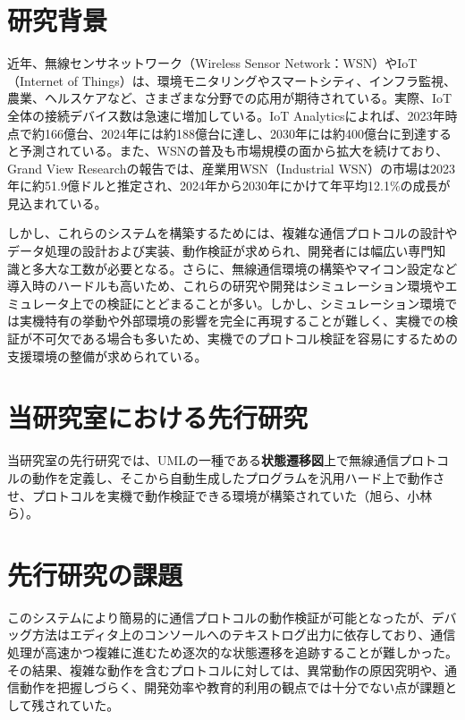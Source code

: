 \documentclass[12pt]{jreport}
\begin{document}
\section{研究背景}
\begin{par}
近年、無線センサネットワーク（Wireless Sensor Network：WSN）やIoT（Internet of Things）は、環境モニタリングやスマートシティ、インフラ監視、農業、ヘルスケアなど、さまざまな分野での応用が期待されている。実際、IoT全体の接続デバイス数は急速に増加している。IoT Analyticsによれば、2023年時点で約166億台、2024年には約188億台に達し、2030年には約400億台に到達すると予測されている\cite{iotanalytics2024}。また、WSNの普及も市場規模の面から拡大を続けており、Grand View Researchの報告では、産業用WSN（Industrial WSN）の市場は2023年に約51.9億ドルと推定され、2024年から2030年にかけて年平均12.1\%の成長が見込まれている\cite{grandview2024}。
\end{par}
\begin{par}
しかし、これらのシステムを構築するためには、複雑な通信プロトコルの設計やデータ処理の設計および実装、動作検証が求められ、開発者には幅広い専門知識と多大な工数が必要となる。さらに、無線通信環境の構築やマイコン設定など導入時のハードルも高いため、これらの研究や開発はシミュレーション環境やエミュレータ上での検証にとどまることが多い。しかし、シミュレーション環境では実機特有の挙動や外部環境の影響を完全に再現することが難しく、実機での検証が不可欠である場合も多いため、実機でのプロトコル検証を容易にするための支援環境の整備が求められている。
\end{par}

\section{当研究室における先行研究}
\begin{par}
当研究室の先行研究では、UMLの一種である\textbf{状態遷移図}上で無線通信プロトコルの動作を定義し、そこから自動生成したプログラムを汎用ハード上で動作させ、プロトコルを実機で動作検証できる環境が構築されていた（旭ら\cite{asahi}、小林ら\cite{kobayashi}）。
\end{par}
\section{先行研究の課題}
\begin{par}
このシステムにより簡易的に通信プロトコルの動作検証が可能となったが、デバッグ方法はエディタ上のコンソールへのテキストログ出力に依存しており、通信処理が高速かつ複雑に進むため逐次的な状態遷移を追跡することが難しかった。その結果、複雑な動作を含むプロトコルに対しては、異常動作の原因究明や、通信動作を把握しづらく、開発効率や教育的利用の観点では十分でない点が課題として残されていた。
\end{par}
\end{document}
